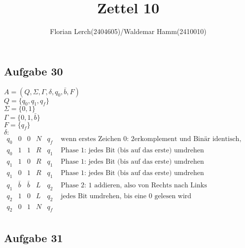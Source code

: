 \documentclass[11pt]{amsart}
\title{Zettel 10}
\author{Florian Lerch(2404605)/Waldemar Hamm(2410010)}
\begin{document}
\maketitle

\subsection*{Aufgabe 30}

$A = (Q, \Sigma, \Gamma, \delta, q_0, \bar{b}, F)$ \\
$Q = \{q_0, q_1, q_f \}$ \\
$\Sigma = \{0, 1\}$ \\
$\Gamma = \{0, 1, \bar{b} \}$ \\
$F = \{q_f\}$ \\
$\delta:$ \\
$\begin{array}{cccccc}
q_0 & 0 & 0 & N & q_f & \mbox{ wenn erstes Zeichen 0: 2erkomplement und Binär identisch, also fertig } \\
q_0 & 1 & 1 & R & q_1 & \mbox{ Phase 1: jedes Bit (bis auf das erste) umdrehen } \\
q_1 & 1 & 0 & R & q_1 & \mbox{ Phase 1: jedes Bit (bis auf das erste) umdrehen } \\
q_1 & 0 & 1 & R & q_1 & \mbox{ Phase 1: jedes Bit (bis auf das erste) umdrehen } \\
q_1 & \bar{b} & \bar{b} & L & q_2 & \mbox{ Phase 2: 1 addieren, also von Rechts nach Links } \\
q_2 & 1 & 0 & L & q_2 & \mbox{ jedes Bit umdrehen, bis eine 0 gelesen wird } \\
q_2 & 0 & 1 & N & q_f & \\ 
\end{array}$

\subsection*{Aufgabe 31}
\end{document}
